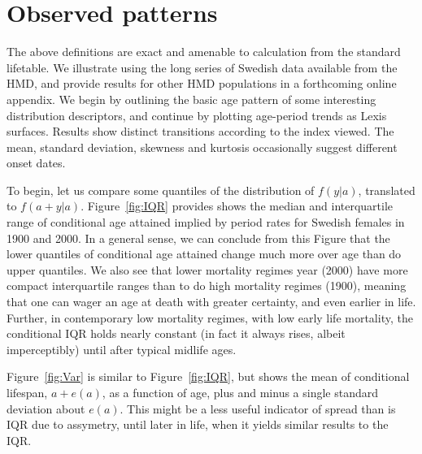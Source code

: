 \documentclass{article}
\begin{document}

\section*{Observed patterns}
The above definitions are exact and amenable to calculation from
the standard lifetable. We illustrate using the long series of Swedish data
available from the HMD, and provide results for other HMD populations in a
forthcoming online appendix. We begin by outlining the basic age pattern of
some interesting distribution descriptors, and continue by plotting
age-period trends as Lexis surfaces. Results show distinct transitions
according to the index viewed. The mean, standard deviation, skewness and
kurtosis occasionally suggest different onset dates. 

To
begin, let us compare some quantiles of the distribution of $f(y|a)$, translated to $f(a+y|a)$. Figure~\ref{fig:IQR} provides shows the median and interquartile range of conditional age attained implied by period rates for Swedish females in 1900 and 2000. In a general sense, we can conclude from this Figure that the lower quantiles of conditional age attained change much more over age than do upper quantiles. We also see that lower mortality regimes year (2000) have more
compact interquartile ranges than to do high mortality regimes (1900), meaning
that one can wager an age at death with greater certainty, and even earlier in
life.
Further, in contemporary low mortality regimes, with low early life mortality, the
conditional IQR holds nearly constant (in fact it always rises, albeit
imperceptibly) until after typical midlife ages.

Figure~\ref{fig:Var} is similar to Figure~\ref{fig:IQR}, but shows the mean of
conditional lifespan, $a+e(a)$, as a function of age, plus and minus a single standard deviation about $e(a)$. This might be a less useful
indicator of spread than is IQR due to assymetry, until later in life, when it
yields similar results to the IQR.
\end{document}
